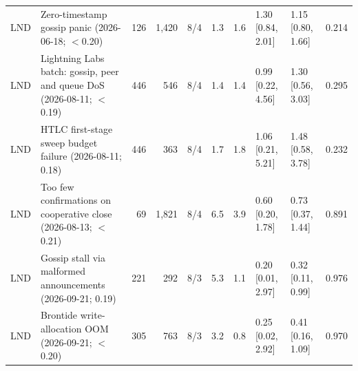 \begin{table}[t]
{\begin{tabular}{llrrrrrllr}
LND & Zero-timestamp gossip panic (2026-06-18; $<$0.20) & 126 & 1,420 & 8/4 & 1.3 & 1.6 & 1.30 [0.84, 2.01] & 1.15 [0.80, 1.66] & 0.214 \\
LND & Lightning Labs batch: gossip, peer and queue DoS (2026-08-11; $<$0.19) & 446 & 546 & 8/4 & 1.4 & 1.4 & 0.99 [0.22, 4.56] & 1.30 [0.56, 3.03] & 0.295 \\
LND & HTLC first-stage sweep budget failure (2026-08-11; 0.18) & 446 & 363 & 8/4 & 1.7 & 1.8 & 1.06 [0.21, 5.21] & 1.48 [0.58, 3.78] & 0.232 \\
LND & Too few confirmations on cooperative close (2026-08-13; $<$0.21) & 69 & 1,821 & 8/4 & 6.5 & 3.9 & 0.60 [0.20, 1.78] & 0.73 [0.37, 1.44] & 0.891 \\
LND & Gossip stall via malformed announcements (2026-09-21; 0.19) & 221 & 292 & 8/3 & 5.3 & 1.1 & 0.20 [0.01, 2.97] & 0.32 [0.11, 0.99] & 0.976 \\
LND & Brontide write-allocation OOM (2026-09-21; $<$0.20) & 305 & 763 & 8/3 & 3.2 & 0.8 & 0.25 [0.02, 2.92] & 0.41 [0.16, 1.09] & 0.970 \\
\bottomrule
\end{tabular}}
\end{table}
